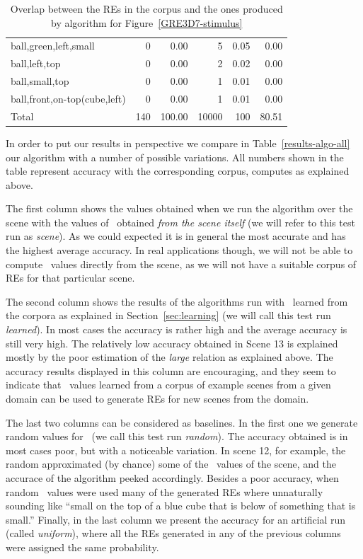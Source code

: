 \begin{table}[t]
\begin{small}
\begin{center}
\begin{tabular}{|l|r|r|r|r|r|}
ball,green,left,small                         &  0 &  0.00 &    5 &  0.05 &  0.00\\
ball,left,top                                 &  0 &  0.00 &    2 &  0.02 &  0.00\\
ball,small,top                                &  0 &  0.00 &    1 &  0.01 &  0.00\\
ball,front,on-top(cube,left)                  &  0 &  0.00 &    1 &  0.01 &  0.00\\
\hline
Total & 140 & 100.00 & 10000 & 100 & 80.51 \\
\hline
\end{tabular}
\caption{Overlap between the REs in the corpus and the ones produced by algorithm for Figure~\ref{GRE3D7-stimulus}\label{results-algo-fig3}}
\end{center}
\end{small}
\end{table}

In order to put our results in perspective we compare in Table~\ref{results-algo-all} 
our algorithm with a number of possible variations.  All numbers shown in the table 
represent accuracy with the corresponding corpus, computes as explained above. 
 
The first column shows the values obtained when we run the algorithm over the scene
with the values of \puse\ obtained \emph{from the scene itself} (we will refer to this
test run as \emph{scene}).  As we could expected
it is in general the most accurate and has the highest average accuracy. In real 
applications though, we will not be able to compute \puse\ values directly from the 
scene, as we will not have a suitable corpus of REs for that particular scene. 

The second column shows the results of the algorithms run with \puse\ learned from the 
corpora as explained in Section~\ref{sec:learning} (we will call this test run \emph{learned}).  In most cases the accuracy 
is rather high and the average accuracy is still very high. The relatively low accuracy 
obtained in Scene 13 is explained mostly by the poor estimation of the \emph{large} 
relation as explained above.  The accuracy results displayed in this column are 
encouraging, and they seem to indicate that \puse\ values learned from a corpus of example 
scenes from a given domain can be used to generate REs for new scenes from the domain. 

The last two columns can be considered as baselines. In the first one we generate 
random values for \puse\ (we call this test run \emph{random}).  The accuracy obtained is in most cases poor, but with 
a noticeable variation. In scene 12, for example, the random \puse approximated 
(by chance) some of the \puse\ values of the scene, and the accurace of the algorithm 
peeked accordingly.  Besides a poor accuracy, when random \puse\ values were used many of the generated REs where unnaturally sounding like ``small 
on the top of a blue cube that is below of something that is small.'' Finally, 
in the last column we present the accuracy for an artificial run (called \emph{uniform}), where all the 
REs generated in any of the previous columns were assigned the same 
probability. 

